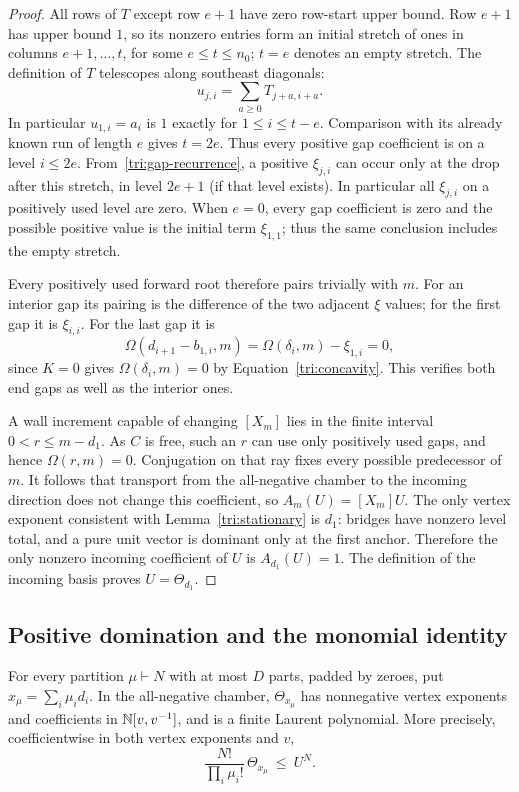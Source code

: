 \begin{proof}
All rows of $T$ except row $e+1$ have zero row-start upper bound.
Row $e+1$ has upper bound $1$, so its nonzero entries form an
initial stretch of ones in columns $e+1,\ldots,t$, for some
$e\leq t\leq n_0$; $t=e$ denotes an empty stretch.
The definition of $T$ telescopes along southeast diagonals:
\begin{equation}\label{tri:diagonal-recovery}
 u_{j,i}=\sum_{a\geq0}T_{j+a,i+a}.
\end{equation}
In particular $u_{1,i}=a_i$ is $1$ exactly for $1\leq i\leq t-e$.
Comparison with its already known run of length $e$ gives
$t=2e$.  Thus every positive gap coefficient is on a level
$i\leq2e$.  From~\eqref{tri:gap-recurrence}, a positive $\xi_{j,i}$
can occur only at the drop after this stretch, in level $2e+1$
(if that level exists).  In particular all $\xi_{j,i}$ on a
positively used level are zero.  When $e=0$, every gap coefficient is
zero and the possible positive value is the initial term $\xi_{1,1}$;
thus the same conclusion includes the empty stretch.

Every positively used forward root therefore pairs trivially with
$m$.  For an interior gap its pairing is the difference of the
two adjacent $\xi$ values; for the first gap it is $\xi_{i,i}$.
For the last gap it is
\[
 \Omega(d_{i+1}-b_{1,i},m)
   =\Omega(\delta_i,m)-\xi_{1,i}=0,
\]
since $K=0$ gives $\Omega(\delta_i,m)=0$ by
Equation~\eqref{tri:concavity}.  This verifies both end gaps as well
as the interior ones.

A wall increment capable of changing $[X_m]$ lies in the finite
interval $0<r\leq m-d_1$.  As $C$ is free, such an $r$ can use
only positively used gaps, and hence $\Omega(r,m)=0$.
Conjugation on that ray fixes every possible predecessor of $m$.
It follows that transport from the all-negative chamber to the
incoming direction does not change this coefficient, so
$A_m(U)=[X_m]U$.
The only vertex exponent consistent with
Lemma~\ref{tri:stationary} is $d_1$: bridges have nonzero level
total, and a pure unit vector is dominant only at the first anchor.
Therefore the only nonzero incoming coefficient of $U$ is
$A_{d_1}(U)=1$.  The definition of the incoming basis proves
$U=\Theta_{d_1}$.
\end{proof}

\subsection{Positive domination and the monomial identity}

\begin{lemma}\label{tri:domination}
For every partition $\mu\vdash N$ with at most $D$ parts, padded by
zeroes, put $x_\mu=\sum_i\mu_i d_i$.  In the all-negative chamber,
$\Theta_{x_\mu}$ has nonnegative vertex exponents and coefficients
in $\mathbb N[v,v^{-1}]$, and is a finite Laurent polynomial.  More
precisely, coefficientwise in both vertex exponents and $v$,
\begin{equation}\label{tri:positive-domination}
 \frac{N!}{\prod_i\mu_i!}\,\Theta_{x_\mu}\ \leq\ U^N.
\end{equation}
\end{lemma}

